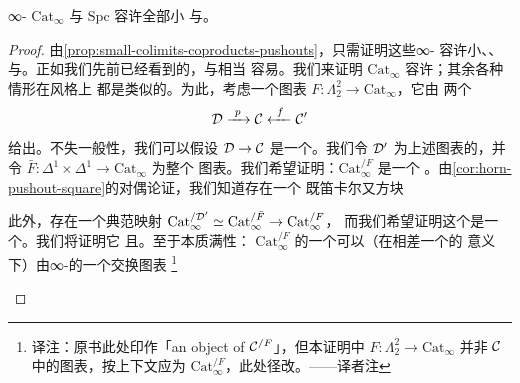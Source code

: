 \begin{theorem}\label{thm:cat-infinity-spc-bicomplete}
∞-\trCategories{} $\mathrm{Cat}_{\infty}$ 与 $\mathrm{Spc}$ 容许全部小\trLimit{}%
与\trColimit{}。
\end{theorem}

\begin{proof}
由\cref{prop:small-colimits-coproducts-pushouts}，只需证明这些∞-\trCategories{}%
容许小\trProduct{}、\trCoproduct{}、\trPullback{}与\trPushout{}。正如我们先前已经看到的，\trCoproduct{}与\trProduct{}相当
容易。我们来证明 $\mathrm{Cat}_{\infty}$ 容许\trPullback{}；其余各种情形在风格上
都是类似的。为此，考虑一个图表 $F\colon \Lambda^2_2 \to \mathrm{Cat}_{\infty}$，它由
两个\trFunctor{}%
\[
\mathcal{D} \xrightarrow{\ p\ } \mathcal{C} \xleftarrow{\ f\ } \mathcal{C}'
\]
给出。不失一般性，我们可以假设 $\mathcal{D} \to \mathcal{C}$ 是一个\trIsofibration{}。我们令 $\mathcal{D}'$
为上述\trSimplicialSets{}图表的\trPullback{}，并令
$\bar{F}\colon \Delta^1 \times \Delta^1 \to \mathrm{Cat}_{\infty}$ 为整个%
\trPullback{}图表。我们希望证明：$\mathrm{Cat}_{\infty}^{/F}$ 是一个%
\trRepresentable{}\trRightFibration{}。由\cref{cor:horn-pushout-square}的对偶论证，我们知道存在一个
既笛卡尔又\trHomotopyCartesian{}方块
\begin{center}
\end{center}
此外，存在一个典范映射
$\mathrm{Cat}_{\infty}^{/\mathcal{D}'} \simeq \mathrm{Cat}_{\infty}^{/\bar{F}} \to \mathrm{Cat}_{\infty}^{/F}$，
而我们希望证明这个\trFunctor{}是一个\trEquivalence{}。我们将证明它%
\trEssentiallySurjective{}且\trFullyFaithful{}。至于本质满性：
$\mathrm{Cat}_{\infty}^{/F}$ 的一个\trObject{}可以（在相差一个\trEquivalence{}的
意义下）由∞-\trCategories{}的一个交换图表
\footnote{译注：原书此处印作「an object of $\mathcal{C}^{/F}$」，但本证明中
$F\colon \Lambda^2_2 \to \mathrm{Cat}_{\infty}$ 并非 $\mathcal{C}$ 中的图表，按上下文应为
$\mathrm{Cat}_{\infty}^{/F}$，此处径改。——译者注}
\begin{center}
\end{center}
\end{proof}
